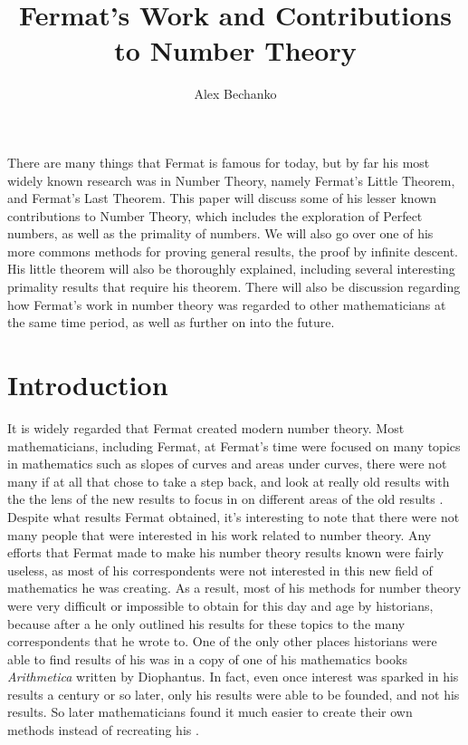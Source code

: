 \documentclass[11pt]{article}
\title{Fermat's Work and Contributions to Number Theory}
\author{Alex Bechanko}
\begin{document}
\maketitle
There are many things that Fermat is famous for today, but by far his most widely
known research was in Number Theory, namely Fermat's Little Theorem, and 
Fermat's Last Theorem.
This paper will discuss some of his lesser
known contributions to Number Theory, which includes the exploration of
Perfect numbers, as well as the primality of numbers.
We will also go over one of his more commons methods for proving general results,
the proof by infinite descent.
His little theorem will also be thoroughly explained, including several 
interesting primality results that require his theorem.
There will also be discussion regarding how Fermat's work in number
theory was regarded to other mathematicians at the same time period, as
well as further on into the future. 


\section*{Introduction}
It is widely regarded that Fermat created modern number theory.
Most mathematicians, including Fermat, at Fermat's time were focused
on many topics in mathematics such as slopes of curves and areas under curves,
there were not many if at all that chose to take a step back, and look at really
old results with the the lens of the new results to focus in on different areas
of the old results \cite{Mahoney}. 
Despite what results Fermat obtained, it's interesting to note that there were
not many people that were interested in his work related to number theory.
Any efforts that Fermat made to make his number theory results known were fairly
useless, as most of his correspondents were not interested in this new field of
mathematics he was creating.
As a result, most of his methods for number theory were very difficult or
impossible to obtain
for this day and age by historians, because after a he only outlined
his results for these topics to the many correspondents that he wrote
to.
One of the only other places historians were able to find results of his was in
a copy of one of his mathematics books \emph{Arithmetica} written by Diophantus.
In fact, even once interest was sparked in his results a century or so later,
only his results were able to be founded, and not his results.
So later mathematicians found it much easier to create their own methods
instead of recreating his \cite{Mahoney}.
\end{document}
